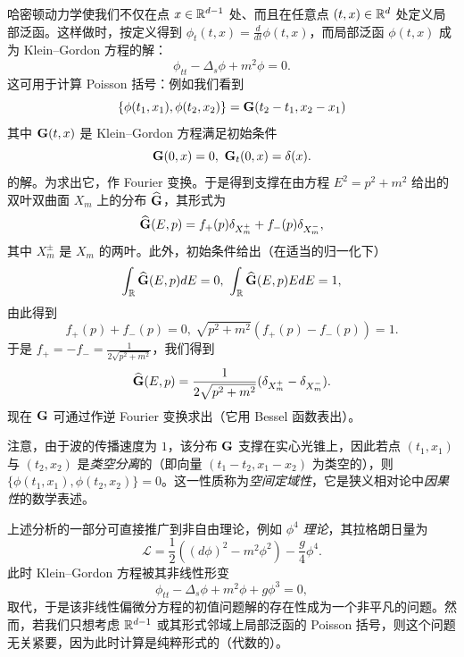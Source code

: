 哈密顿动力学使我们不仅在点 $x\in \Bbb R^{d-1}$ 处、而且在任意点 $(t,x)\in \Bbb R^d$ 处定义局部泛函。这样做时，按定义得到 $\phi_t(t,x)=\frac{d}{dt}\phi(t,x)$，而局部泛函 $\phi(t,x)$ 成为 Klein--Gordon 方程的解：
$$
\phi_{tt}-\Delta_s\phi+m^2\phi=0.
$$
这可用于计算 Poisson 括号：例如我们看到
$$
\lbrace\phi(t_1,x_1),\phi(t_2,x_2)\rbrace=\bold G(t_2-t_1,x_2-x_1)
$$
其中 $\bold G(t,x)$ 是 Klein--Gordon 方程满足初始条件
$$
\bold G(0,x)=0,\ \bold G_t(0,x)=\delta(x). 
$$
的解。为求出它，作 Fourier 变换。于是得到支撑在由方程 $E^2=p^2+m^2$ 给出的双叶双曲面 $X_m$ 上的分布 $\widehat {\bold G}$，其形式为
$$
\widehat {\bold G}(E,p)=f_+(p)\delta_{X_m^+}+f_-(p)\delta_{X_m^-},
$$
其中 $X_m^\pm$ 是 $X_m$ 的两叶。此外，初始条件给出（在适当的归一化下）
$$
\int_{\Bbb R} \widehat {\bold G}(E,p)dE=0,\ \int_{\Bbb R} \widehat {\bold G}(E,p)EdE=1,
$$
由此得到
$$
f_+(p)+f_-(p)=0,\ \sqrt{p^2+m^2}(f_+(p)-f_-(p))=1.
$$
于是 $f_+=-f_-=\frac{1}{2\sqrt{p^2+m^2}}$，我们得到
$$
\widehat {\bold G}(E,p)=\frac{1}{2\sqrt{p^2+m^2}}(\delta_{X_m^+}-\delta_{X_m^-}).
$$
现在 $\bold G$ 可通过作逆 Fourier 变换求出（它用 Bessel 函数表出）。

注意，由于波的传播速度为 $1$，该分布 $\bold G$ 支撑在实心光锥上，因此若点 $(t_1,x_1)$ 与 $(t_2,x_2)$ 是\emph{类空分离}的（即向量 $(t_1-t_2,x_1-x_2)$ 为类空的），则 $\lbrace\phi(t_1,x_1),\phi(t_2,x_2)\rbrace=0$。这一性质称为\emph{空间定域性}，它是狭义相对论中\emph{因果性}的数学表述。


\begin{remark} 上述分析的一部分可直接推广到非自由理论，例如 $\phi^4$ \emph{理论}，其拉格朗日量为
$$
\mathcal L=\frac{1}{2}((d\phi)^2-m^2\phi^2)-\frac{g}{4}\phi^4.
$$
此时 Klein--Gordon 方程被其非线性形变
$$
\phi_{tt}-\Delta_s\phi+m^2\phi+g\phi^3=0,
$$
取代，于是该非线性偏微分方程的初值问题解的存在性成为一个非平凡的问题。然而，若我们只想考虑 $\Bbb R^{d-1}$ 或其形式邻域上局部泛函的 Poisson 括号，则这个问题无关紧要，因为此时计算是纯粹形式的（代数的）。
\end{remark}


